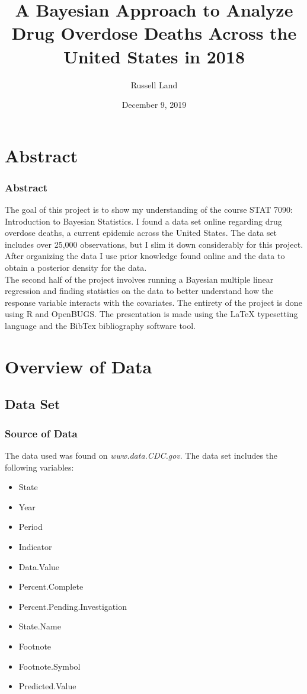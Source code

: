 \documentclass[10pt]{beamer}
\author{Russell Land}
\title[Analyzing Data on Drug Overdoses Across the US]{A Bayesian Approach to Analyze Drug Overdose Deaths Across the United States in 2018}
\institute{Georgia Southern University}
\date{December 9, 2019}
\begin{document}
\begin{frame}
\titlepage
\end{frame}

\begin{frame}
\tableofcontents
\end{frame}

\section{Abstract}
\begin{frame}
\frametitle{Abstract}
The goal of this project is to show my understanding of the course STAT 7090: Introduction to Bayesian Statistics. I found a data set online regarding drug overdose deaths, a current epidemic across the United States. The data set includes over 25,000 observations, but I slim it down considerably for this project. After organizing the data I use prior knowledge found online and the data to obtain a posterior density for the data.\\[2mm]
The second half of the project involves running a Bayesian multiple linear regression and finding statistics on the data to better understand how the response variable interacts with the covariates. The entirety of the project is done using R and OpenBUGS. The presentation is made using the \LaTeX\; typesetting language and the BibTex bibliography software tool.
\end{frame}

\section{Overview of Data}
\subsection{Data Set}
\begin{frame}
\frametitle{Source of Data}
The data used was found on {\it www.data.CDC.gov}\cite{data}. The data set includes the following variables:
	\begin{itemize}
		\item State
		\item Year
		\item Period
		\item Indicator
		\item Data.Value
		\item Percent.Complete
		\item Percent.Pending.Investigation
		\item State.Name
		\item Footnote
		\item Footnote.Symbol
		\item Predicted.Value
	\end{itemize}
\end{frame}
\end{document}
